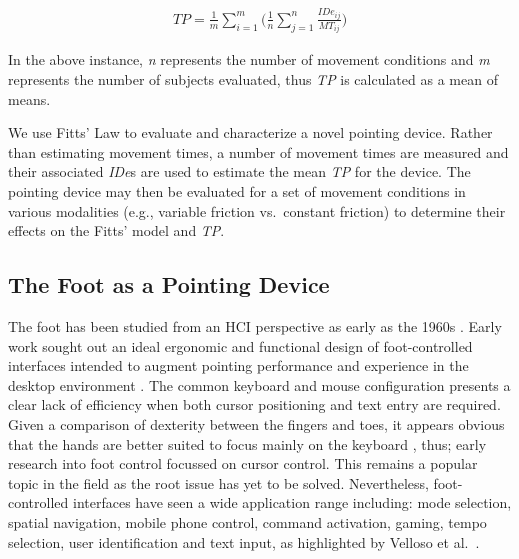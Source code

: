 \documentclass [12pt,letterpaper]{report}
\begin{document}
\begin{align}
	TP = \frac{1}{m} \sum_{i=1}^{m} \bigg( \frac{1}{n} \sum_{j=1}^{n} \frac{I\!De_{ij}}{MT_{ij}}  \bigg)
\end{align}

In the above instance, \textit{n} represents the number of movement conditions and \textit{m} represents the number of subjects evaluated, thus \textit{TP} is calculated as a mean of means.


We use Fitts' Law to evaluate and characterize a novel pointing device. Rather than estimating movement times, a number of movement times are measured and their associated \textit{IDe}s are used to estimate the mean \textit{TP} for the device. The pointing device may then be evaluated for a set of movement conditions in various modalities (e.g., variable friction vs.\ constant friction) to determine their effects on the Fitts' model and \textit{TP}.


\subsection{The Foot as a Pointing Device}

The foot has been studied from an HCI perspective as early as the 1960s \cite{english1967display}. Early work sought out an ideal ergonomic and functional design of foot-controlled interfaces intended to augment pointing performance and experience in the desktop environment \cite{english1967display,pearson1986moles,pearson1988exploratory}. The common keyboard and mouse configuration presents a clear lack of efficiency when both cursor positioning and text entry are required. Given a comparison of dexterity between the fingers and toes, it appears obvious that the hands are better suited to focus mainly on the keyboard \cite{pakkanen2004appropriateness}, thus; early research into foot control focussed on cursor control. This remains a popular topic in the field as the root issue has yet to be solved. Nevertheless, foot-controlled interfaces have seen a wide application range including: mode selection, spatial navigation, mobile phone control, command activation, gaming, tempo selection, user identification and text input, as highlighted by Velloso et al.\ \cite{velloso2015interactions}.
\end{document}
